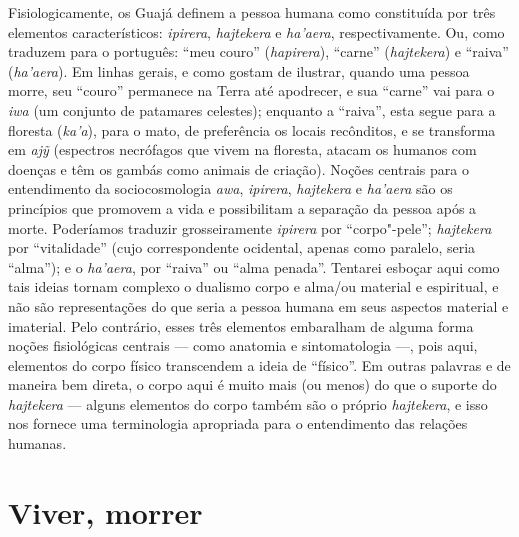 Fisiologicamente, os Guajá definem a pessoa humana como constituída por
três elementos característicos: \emph{ipirera}, \emph{hajtekera} e
\emph{ha'aera}, respectivamente. Ou, como traduzem para o português:
``meu couro'' (\emph{hapirera}), ``carne'' (\emph{hajtekera}) e ``raiva''
(\emph{ha'aera}). Em linhas gerais, e como gostam de ilustrar, quando
uma pessoa morre, seu ``couro'' permanece na Terra até apodrecer, e sua
``carne'' vai para o \emph{iwa} (um conjunto de patamares celestes);
enquanto a ``raiva'', esta segue para a floresta (\emph{ka'a}), para o
mato, de preferência os locais recônditos, e se transforma em \emph{ajỹ}
(espectros necrófagos que vivem na floresta, atacam os humanos com
doenças e têm os gambás como animais de criação). Noções centrais para o
entendimento da sociocosmologia \emph{awa}, \emph{ipirera},
\emph{hajtekera} e \emph{ha'aera} são os princípios que promovem a vida
e possibilitam a separação da pessoa após a morte. Poderíamos traduzir
grosseiramente \emph{ipirera} por ``corpo"-pele''; \emph{hajtekera} por
``vitalidade'' (cujo correspondente ocidental, apenas como paralelo, seria
``alma''); e o \emph{ha'aera}, por ``raiva'' ou ``alma penada''. Tentarei
esboçar aqui como tais ideias tornam complexo o dualismo corpo e alma/ou
material e espiritual, e não são representações do que seria a pessoa
humana em seus aspectos material e imaterial. Pelo contrário, esses três
elementos embaralham de alguma forma noções fisiológicas centrais --- como
anatomia e sintomatologia ---, pois aqui, elementos do corpo físico
transcendem a ideia de ``físico''. Em outras palavras e de maneira bem
direta, o corpo aqui é muito mais (ou menos) do que o suporte do
\emph{hajtekera} --- alguns elementos do corpo também são o próprio
\emph{hajtekera}, e isso nos fornece uma terminologia apropriada para o
entendimento das relações humanas.

\section{Viver, morrer}\label{viver-morrer}

